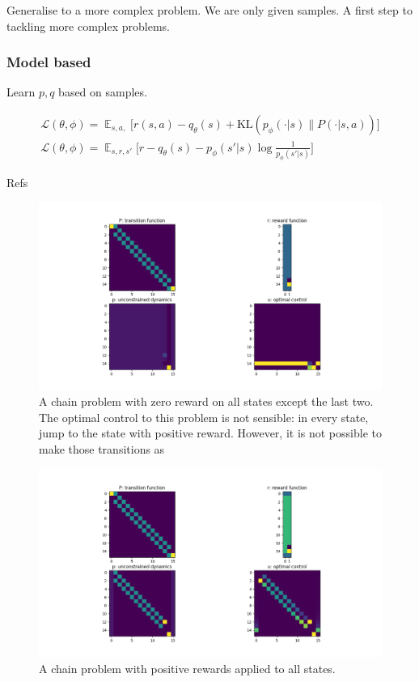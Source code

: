 Generalise to a more complex problem. We are only given samples. A first
step to tackling more complex problems.


\subsubsection{Model based}

Learn \(p, q\) based on samples.

\begin{align}
\mathcal L(\theta, \phi) = \mathop{\mathbb E}_{s, a,} \bigg[ r(s, a) - q_\theta(s) + \text{KL}(p_\phi(\cdot | s) \parallel P(\cdot | s, a)) \bigg]\\
\mathcal L(\theta, \phi) = \mathop{\mathbb E}_{s, r, s'} \bigg[r - q_\theta(s) - p_\phi(s' | s) \log \frac{1}{ p_\phi(s' | s)} \bigg]
\end{align}


Refs \cite{Todorov2006,Todorov2009,Zhong,Zhonga,Dvijotham,Wozabal}


\begin{figure}
\centering
\includegraphics[width=1\textwidth,height=0.35\textheight]{../../pictures/figures/chain-test-zero-rewards.png}
\caption{A chain problem with zero reward on all states except the last two.
The optimal control to this problem is not sensible: in every state, jump to the state with positive reward.
However, it is not possible to make those transitions as }
\end{figure}

\begin{figure}
\centering
\includegraphics[width=1\textwidth,height=0.35\textheight]{../../pictures/figures/chain-test-pos-rewards.png}
\caption{A chain problem with positive rewards applied to all states.}
\end{figure}

